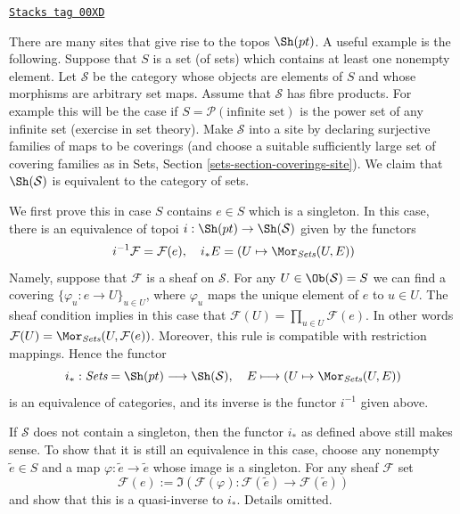 \begin{remark}[Pt topos]
\label{sites-remark-pt-topos}
\href{https://stacks.math.columbia.edu/tag/00XD}{\texttt{Stacks tag 00XD}}

There are many sites that give rise to the topos $\Sh(pt)$.
A useful example is the following. Suppose that $S$ is a set (of sets)
which contains at least one nonempty element. Let $\mathcal{S}$ be the
category whose objects are elements of $S$ and whose morphisms are
arbitrary set maps. Assume that $\mathcal{S}$ has fibre products.
For example this will be the case if $S = \mathcal{P}(\text{infinite set})$
is the power set of any infinite set (exercise in set theory).
Make $\mathcal{S}$ into a site by declaring
surjective families of maps to be coverings (and choose
a suitable sufficiently large set of covering families as in
Sets, Section \ref{sets-section-coverings-site}).
We claim that $\Sh(\mathcal{S})$ is equivalent to the category of
sets.

\medskip\noindent
We first prove this in case $S$ contains $e \in S$ which is a singleton.
In this case, there is an equivalence of topoi
$i : \Sh(pt) \to \Sh(\mathcal{S})$ given by
the functors
\begin{equation}
\label{equation-sheaves-pt-sets}
i^{-1}\mathcal{F} = \mathcal{F}(e), \quad
i_*E = (U \mapsto \Mor_{\textit{Sets}}(U, E))
\end{equation}
Namely, suppose that $\mathcal{F}$ is a sheaf on $\mathcal{S}$.
For any $U \in \Ob(\mathcal{S}) = S$ we can find a covering
$\{\varphi_u : e \to U\}_{u \in U}$, where $\varphi_u$
maps the unique element of $e$ to $u \in U$. The sheaf condition
implies in this case that
$\mathcal{F}(U) = \prod_{u \in U} \mathcal{F}(e)$.
In other words
$\mathcal{F}(U) = \Mor_{\textit{Sets}}(U, \mathcal{F}(e))$.
Moreover, this rule is compatible with restriction mappings. Hence
the functor
$$
i_* :
\textit{Sets} = \Sh(pt)
\longrightarrow
\Sh(\mathcal{S}), \quad
E \longmapsto (U \mapsto \Mor_{\textit{Sets}}(U, E))
$$
is an equivalence of categories, and its inverse is the functor
$i^{-1}$ given above.

\medskip\noindent
If $\mathcal{S}$ does not contain a singleton, then the functor
$i_*$ as defined above still makes sense. To show that it is still
an equivalence in this case, choose any nonempty $\tilde e \in S$
and a map $\varphi : \tilde e \to \tilde e$ whose image is a singleton.
For any sheaf $\mathcal{F}$ set
$$
\mathcal{F}(e) :=
\Im(
\mathcal{F}(\varphi) :
\mathcal{F}(\tilde e)
\longrightarrow
\mathcal{F}(\tilde e)
)
$$
and show that this is a quasi-inverse to $i_*$. Details omitted.
\end{remark}

